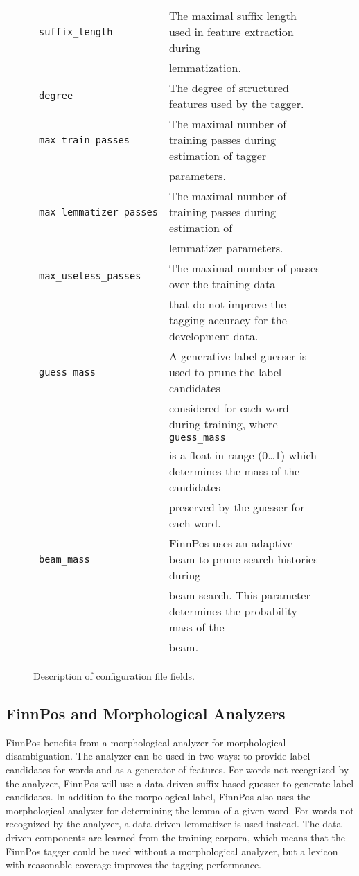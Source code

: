 \documentclass{llncs}
\begin{document}
\begin{figure}
\begin{tabular}{ll}
{\tt suffix\_length} & The maximal suffix length used in feature extraction during\\
                     & lemmatization.\\
{\tt degree} & The degree of structured features used by the tagger. \\
{\tt max\_train\_passes} & The maximal number of training passes during estimation of tagger\\
                         & parameters.\\
{\tt max\_lemmatizer\_passes} & The maximal number of training passes during estimation of\\
                              & lemmatizer parameters.\\
{\tt max\_useless\_passes} & The maximal number of passes over the training data\\
                           & that do not improve the tagging accuracy for the development data.\\
{\tt guess\_mass} & A generative label guesser is used to prune the label candidates\\
                  & considered for each word during training, where {\tt guess\_mass}\\
                  & is a float in range (0\ldots1) which determines the mass of the candidates\\
                  &  preserved by the guesser for each word.\\
{\tt beam\_mass} & FinnPos uses an adaptive beam to prune search histories during\\
                 & beam search. This parameter determines the probability mass of the\\
                 & beam.
\end{tabular}
\caption{Description of configuration file fields.}\label{fig:config-fields}
\end{figure}

\subsection{FinnPos and Morphological Analyzers}

FinnPos benefits from a morphological analyzer for morphological disambiguation. 
The analyzer can be used in two ways: to provide label candidates for words 
and as a generator of features. For words not recognized by the analyzer, 
FinnPos will use a data-driven suffix-based guesser to generate label candidates.
In addition to the morpological label, FinnPos also uses the
morphological analyzer for determining the lemma of a given word. For
words not recognized by the analyzer, a data-driven lemmatizer is used
instead. The data-driven components are learned from the training corpora, which means
that the FinnPos tagger could be used without a morphological analyzer, 
but a lexicon with reasonable coverage improves the tagging performance.
\end{document}
